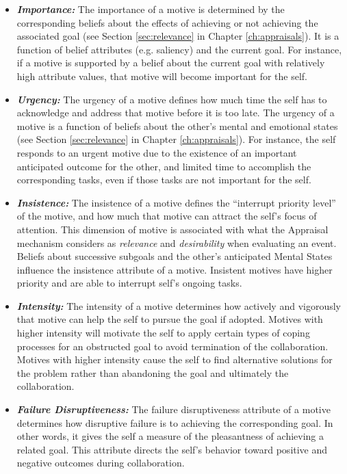 \documentclass[12pt]{report}
\begin{document}
\begin{itemize}
  \item \textbf{\textit{Importance:}} The importance of a motive is determined
  by the corresponding beliefs about the effects of achieving or not achieving
  the associated goal (see Section \ref{sec:relevance} in Chapter
  \ref{ch:appraisals}). It is a function of belief attributes (e.g. saliency)
  and the current goal. For instance, if a motive is supported by a belief about
  the current goal with relatively high attribute values, that motive will
  become important for the self.
  
  \item \textbf{\textit{Urgency:}} The urgency of a motive defines how much time
  the self has to acknowledge and address that motive before it is too late.
  The urgency of a motive is a function of beliefs about the other's mental
  and emotional states (see Section \ref{sec:relevance} in Chapter
  \ref{ch:appraisals}). For instance, the self responds to an urgent motive due
  to the existence of an important anticipated outcome for the other, and
  limited time to accomplish the corresponding tasks, even if those tasks are
  not important for the self.
  
  \item \textbf{\textit{Insistence:}} The insistence of a motive defines the
  ``interrupt priority level'' of the motive, and how much that motive can
  attract the self's focus of attention. This dimension of motive is associated
  with what the Appraisal mechanism considers as \emph{relevance} and
  \emph{desirability} when evaluating an event. Beliefs about successive
  subgoals and the other's anticipated Mental States influence the insistence
  attribute of a motive. Insistent motives have higher priority and are able to
  interrupt self's ongoing tasks.
  
  \item \textbf{\textit{Intensity:}} The intensity of a motive determines how
  actively and vigorously that motive can help the self to pursue the goal if
  adopted. Motives with higher intensity will motivate the self to apply
  certain types of coping processes for an obstructed goal to avoid termination
  of the collaboration. Motives with higher intensity cause the self to find
  alternative solutions for the problem rather than abandoning the goal and
  ultimately the collaboration.
  
  \item \textbf{\textit{Failure Disruptiveness:}} The failure disruptiveness
  attribute of a motive determines how disruptive failure is to achieving the
  corresponding goal. In other words, it gives the self a measure of the
  pleasantness of achieving a related goal. This attribute directs the self's
  behavior toward positive and negative outcomes during collaboration.
\end{itemize}
\end{document}
